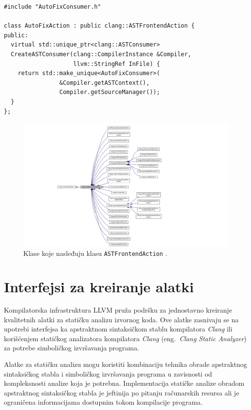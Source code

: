 \documentclass[12pt,oneside]{memoir}
\begin{document}
\begin{lstlisting}[style=customc,  caption={Implementacija klase \texttt{AutoFixAction}. Klasa \texttt{AutoFixConstumer} prikazana je na listingu \ref{lst:labelConsumer} i dostupna je kroz zaglavlje \texttt{AutoFixConsumer.h}.}, label=lst:ASTAction]
#include "AutoFixConsumer.h"

class AutoFixAction : public clang::ASTFrontendAction {
public:
  virtual std::unique_ptr<clang::ASTConsumer>
  CreateASTConsumer(clang::CompilerInstance &Compiler, 
                    llvm::StringRef InFile) {
    return std::make_unique<AutoFixConsumer>(
                &Compiler.getASTContext(),
                Compiler.getSourceManager());
  }
};
\end{lstlisting}


\begin{figure}[h!]
\begin{center}
\includegraphics[scale=0.4]{ASTFrontendAction.png}
\end{center}
\caption{Klase koje nasleđuju klasu \texttt{ASTFrontendAction} \cite{ASTFrontendAction}.}
\label{fig:ASTAction}
\end{figure}



\section{Interfejsi za kreiranje alatki}

Kompilatorska infrastruktura LLVM pru\v{z}a podr\v{s}ku za jednostavno kreiranje kvalitetnih alatki za stati\v{c}ku analizu izvornog koda. Ove alatke
zasnivaju se na upotrebi interfejsa ka apstraktnom sintaksi\v{c}kom stablu kompilatora \textit{Clang} ili kori\v{s}\'{c}enjem stati\v{c}kog analizatora kompilatora \textit{Clang} (eng.~\textit{Clang Static Analyzer}) za potrebe simboli\v{c}kog izvr\v{s}avanja programa. \par Alatke za stati\v{c}ku analizu mogu koristiti kombinaciju tehnika obrade apstraktnog sintaksi\v{c}kog stabla i simboli\v{c}kog izvr\v{s}avanja programa u zavisnosti od kompleksnosti analize koja je potrebna. Implementacija stati\v{c}ke analize obradom apstraktnog sintaksi\v{c}kog stabla je jeftinija po pitanju ra\v{c}unarskih resursa ali je ograni\v{c}ena informacijama dostupnim tokom kompilacije programa. \par 
\end{document}
